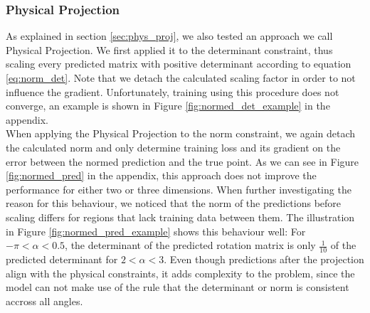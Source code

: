 \subsubsection{Physical Projection}
As explained in section \ref{sec:phys_proj}, we also tested an approach we call Physical Projection. We first applied it to the determinant constraint, thus scaling every predicted matrix with positive determinant according to equation \eqref{eq:norm_det}. Note that we detach the calculated scaling factor in order to not influence the gradient. Unfortunately, training using this procedure does not converge, an example is shown in Figure \ref{fig:normed_det_example} in the appendix.\\
\indent When applying the Physical Projection to the norm constraint, we again detach the calculated norm and only determine training loss and its gradient on the error between the normed prediction and the true point. As we can see in Figure \ref{fig:normed_pred} in the appendix, this approach does not improve the performance for either two or three dimensions. When further investigating the reason for this behaviour, we noticed that the norm of the predictions before scaling differs for regions that lack training data between them. The illustration in Figure \ref{fig:normed_pred_example} shows this behaviour well: For $-\pi < \alpha < 0.5$, the determinant of the predicted rotation matrix is only $\frac{1}{10}$ of the predicted determinant for $2 < \alpha < 3$. Even though predictions after the projection align with the physical constraints, it adds complexity to the problem, since the model can not make use of the rule that the determinant or norm is consistent accross all angles.







\clearpage

